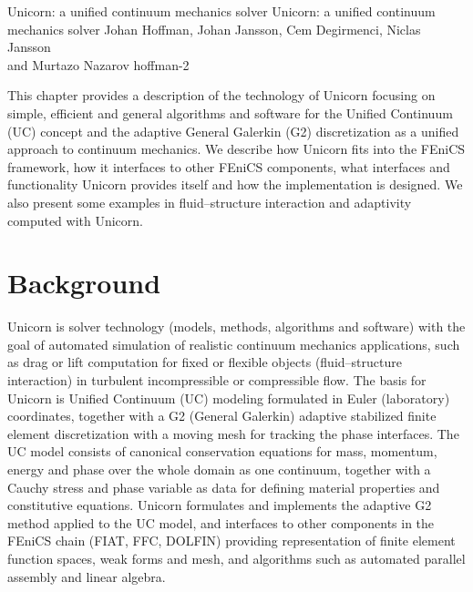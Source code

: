\begingroup

\setcounter{chapter}{17}
\setcounter{chpnum}{17}

              {Unicorn: a unified continuum mechanics solver}
              {Unicorn: a unified continuum mechanics solver}
              {Johan Hoffman, Johan Jansson, Cem Degirmenci,
                Niclas Jansson\\ and Murtazo Nazarov}
              {hoffman-2}


This chapter provides a description of the technology of Unicorn
focusing on simple, efficient and general algorithms and software for
the Unified Continuum (UC) concept and the adaptive General Galerkin
(G2) discretization as a unified approach to continuum mechanics. We
describe how Unicorn fits into the FEniCS framework, how it interfaces
to other FEniCS components, what interfaces and functionality Unicorn
provides itself and how the implementation is designed. We also
present some examples in fluid--structure interaction and adaptivity
computed with Unicorn.

\section{Background}

Unicorn is solver technology (models, methods, algorithms and
software) with the goal of automated simulation of realistic continuum
mechanics applications, such as drag or lift computation for fixed or
flexible objects (fluid--structure interaction) in turbulent
incompressible or compressible flow. The basis for Unicorn is Unified
Continuum (UC) modeling \citep{HoffmanJanssonStockli2011} formulated
in Euler (laboratory) coordinates, together with a G2 (General
Galerkin) adaptive stabilized finite element discretization with a
moving mesh for tracking the phase interfaces. The UC model consists
of canonical conservation equations for mass, momentum, energy and
phase over the whole domain as one continuum, together with a Cauchy
stress and phase variable as data for defining material properties and
constitutive equations. Unicorn formulates and implements the adaptive
G2 method applied to the UC model, and interfaces to other components
in the FEniCS chain (FIAT, FFC, DOLFIN) providing representation of
finite element function spaces, weak forms and mesh, and algorithms
such as automated parallel assembly and linear algebra.

